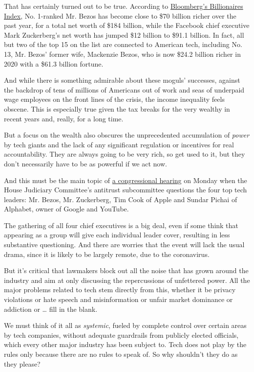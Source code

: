 That has certainly turned out to be true. According to
\href{https://www.bloomberg.com/billionaires/}{Bloomberg's Billionaires
Index}, No. 1-ranked Mr. Bezos has become close to \$70 billion richer
over the past year, for a total net worth of \$184 billion, while the
Facebook chief executive Mark Zuckerberg's net worth has jumped \$12
billion to \$91.1 billion. In fact, all but two of the top 15 on the
list are connected to American tech, including No. 13, Mr. Bezos' former
wife, Mackenzie Bezos, who is now \$24.2 billion richer in 2020 with a
\$61.3 billion fortune.

And while there is something admirable about these moguls' successes,
against the backdrop of tens of millions of Americans out of work and
seas of underpaid wage employees on the front lines of the crisis, the
income inequality feels obscene. This is especially true given the tax
breaks for the very wealthy in recent years and, really, for a long
time.

But a focus on the wealth also obscures the unprecedented accumulation
of \emph{power} by tech giants and the lack of any significant
regulation or incentives for real accountability. They are always going
to be very rich, so get used to it, but they don't necessarily have to
be as powerful if we act now.

And this must be the main topic of
\href{https://www.cnbc.com/2020/07/01/apple-google-amazon-and-facebook-ceos-to-testify-in-congress.html}{a
congressional hearing} on Monday when the House Judiciary Committee's
antitrust subcommittee questions the four top tech leaders: Mr. Bezos,
Mr. Zuckerberg, Tim Cook of Apple and Sundar Pichai of Alphabet, owner
of Google and YouTube.

The gathering of all four chief executives is a big deal, even if some
think that appearing as a group will give each individual leader cover,
resulting in less substantive questioning. And there are worries that
the event will lack the usual drama, since it is likely to be largely
remote, due to the coronavirus.

But it's critical that lawmakers block out all the noise that has grown
around the industry and aim at only discussing the repercussions of
unfettered power. All the major problems related to tech stem directly
from this, whether it be privacy violations or hate speech and
misinformation or unfair market dominance or addiction or \ldots{} fill
in the blank.

We must think of it all as \emph{systemic}, fueled by complete control
over certain areas by tech companies, without adequate guardrails from
publicly elected officials, which every other major industry has been
subject to. Tech does not play by the rules only because there are no
rules to speak of. So why shouldn't they do as they please?

